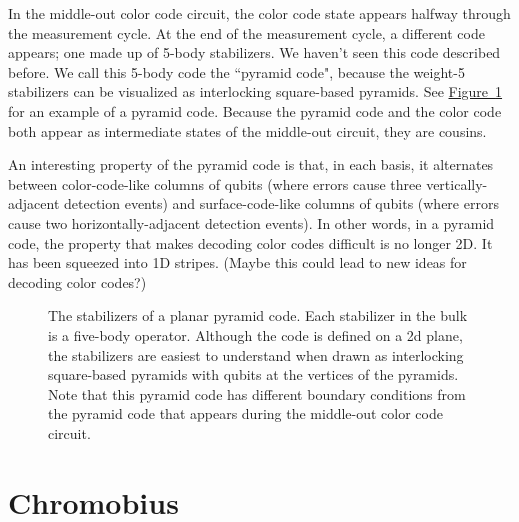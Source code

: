 \documentclass[onecolumn,unpublished,a4paper]{quantumarticle}
\theoremstyle{definition}
\theoremstyle{definition}
\theoremstyle{definition}
\newcommand{\fig}[1]{\hyperref[fig:#1]{Figure~\ref*{fig:#1}}}
\begin{document}
In the middle-out color code circuit, the color code state appears halfway through the measurement cycle.
At the end of the measurement cycle, a different code appears; one made up of 5-body stabilizers.
We haven't seen this code described before.
We call this 5-body code the ``pyramid code", because the weight-5 stabilizers can be visualized as interlocking square-based pyramids.
See \fig{pyramid-code} for an example of a pyramid code.
Because the pyramid code and the color code both appear as intermediate states of the middle-out circuit, they are cousins.

An interesting property of the pyramid code is that, in each basis, it alternates between color-code-like columns of qubits (where errors cause three vertically-adjacent detection events) and surface-code-like columns of qubits (where errors cause two horizontally-adjacent detection events).
In other words, in a pyramid code, the property that makes decoding color codes difficult is no longer 2D.
It has been squeezed into 1D stripes.
(Maybe this could lead to new ideas for decoding color codes?)

\begin{figure}
    \centering
    \caption{
        The stabilizers of a planar pyramid code.
        Each stabilizer in the bulk is a five-body operator.
        Although the code is defined on a 2d plane, the stabilizers are easiest to understand when drawn as interlocking square-based pyramids with qubits at the vertices of the pyramids.
        Note that this pyramid code has different boundary conditions from the pyramid code that appears during the middle-out color code circuit.
    }
    \label{fig:pyramid-code}
\end{figure}



\section{Chromobius}
\label{sec:chromobius}
\end{document}
